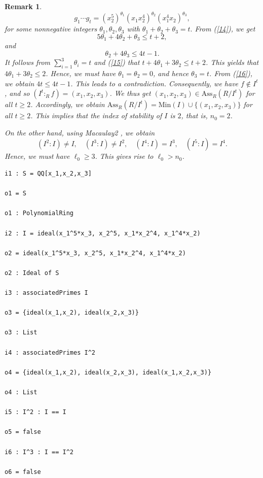 \documentclass[11pt]{amsart}
\newtheorem{remark}[theorem]{Remark}
\begin{document}
\begin{remark}
{\begin{equation}
g_1 \cdots  g_t=(x_2^5)^{{\theta}_1} (x_1x_2^4)^{{\theta}_2} (x_1^4x_2)^{{\theta}_3}, 
\label{14}
\end{equation}
for some nonnegative integers $ {\theta}_1, \theta_2,  {\theta}_3$ with ${\theta}_1 +  \theta_2 +  {\theta}_3=t.$
 From  (\ref{14}), we get  
\begin{equation}
5\theta_1 + 4 \theta_2 + \theta_3 \leq t+2, \label{15}
\end{equation}
and 
\begin{equation}
\theta_2 + 4\theta_3  \leq  4t-1. \label{16}
\end{equation}
It follows from  $\sum_{i=1}^3 \theta_i =t$ and  (\ref{15}) that $t+4\theta_1+ 3\theta_2  \leq t+2$. This yields that  $4\theta_1+ 3\theta_2 \leq 2$. 
Hence, we must have $\theta_1= \theta_2=0$, and hence  $\theta_3 =t$. From  (\ref{16}), we obtain  $4t  \leq 4t-1$. This leads to a   contradiction. 
Consequently, we have $f \notin I^t$, and so $(I^t:_Rf) =(x_1, x_2, x_3)$. We thus get   $(x_1, x_2, x_3) \in 
\mathrm{Ass}_R(R/I^t)$ for all $t\geq 2$. Accordingly, we obtain $\mathrm{Ass}_R(R/I^t)=\mathrm{Min}(I) \cup
\{(x_1, x_2, x_3)\}$ for all $t\geq 2$. This implies that the  index of stability of  $I$ is $2$, that is, $n_0=2$. 

On the other hand, using Macaulay2 \cite{GS}, we obtain  $$(I^2:I)\neq I, \quad  (I^3:I)\neq I^2, \quad  (I^4:I)=I^3, \quad (I^5:I)=I^4.$$
Hence, we must have $\ell_0\geq 3$. This gives rise to $\ell_0 > n_0$. 
 \begin{verbatim}
i1 : S = QQ[x_1,x_2,x_3]

o1 = S

o1 : PolynomialRing

i2 : I = ideal(x_1^5*x_3, x_2^5, x_1*x_2^4, x_1^4*x_2)

o2 = ideal(x_1^5*x_3, x_2^5, x_1*x_2^4, x_1^4*x_2)

o2 : Ideal of S

i3 : associatedPrimes I

o3 = {ideal(x_1,x_2), ideal(x_2,x_3)}

o3 : List

i4 : associatedPrimes I^2

o4 = {ideal(x_1,x_2), ideal(x_2,x_3), ideal(x_1,x_2,x_3)}

o4 : List

i5 : I^2 : I == I

o5 = false

i6 : I^3 : I == I^2

o6 = false


\end{verbatim}}
\end{remark}
\end{document}
